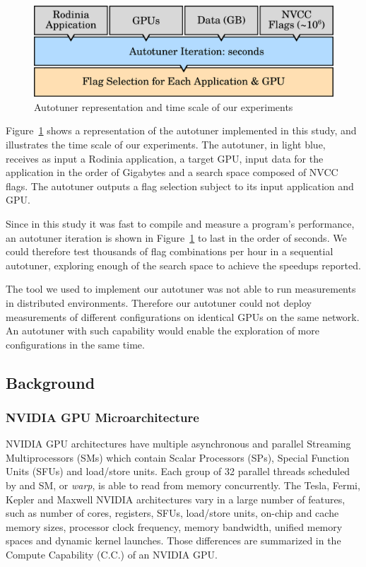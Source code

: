 \begin{figure}[htpb]
    \centering
    \includegraphics[width=.65\textwidth]{./images/overview_gpus}
    \caption{Autotuner representation and time scale of our experiments}
    \label{fig:overview-gpus}
\end{figure}

Figure~\ref{fig:overview-gpus} shows a representation of the autotuner
implemented in this study, and illustrates the time scale of our experiments.
The autotuner, in light blue, receives as input a Rodinia application, a target
GPU, input data for the application in the order of Gigabytes and a search
space composed of NVCC flags. The autotuner outputs a flag selection subject to
its input application and GPU.

Since in this study it was fast to compile and measure a program's performance,
an autotuner iteration is shown in Figure~\ref{fig:overview-gpus} to last in
the order of seconds. We could therefore test thousands of flag combinations
per hour in a sequential autotuner, exploring enough of the search space to
achieve the speedups reported.

The tool we used to implement our autotuner was not able to run measurements in
distributed environments. Therefore our autotuner could not deploy measurements
of different configurations on identical GPUs on the same network. An autotuner
with such capability would enable the exploration of more configurations in the
same time.

\subsection{Background}

\subsubsection{NVIDIA GPU Microarchitecture}
\label{sec:GPUsCUDA}

NVIDIA GPU architectures have multiple asynchronous and parallel Streaming
Multiprocessors (SMs) which contain Scalar Processors (SPs), Special Function
Units (SFUs) and load/store units. Each group of 32 parallel threads scheduled
by and SM, or \textit{warp}, is able to read from memory concurrently.  The
Tesla, Fermi, Kepler and Maxwell NVIDIA architectures vary in a large number of
features, such as number of cores, registers, SFUs, load/store units, on-chip
and cache memory sizes, processor clock frequency, memory bandwidth, unified
memory spaces and dynamic kernel launches.  Those differences are summarized in
the Compute Capability (C.C.) of an NVIDIA GPU.

